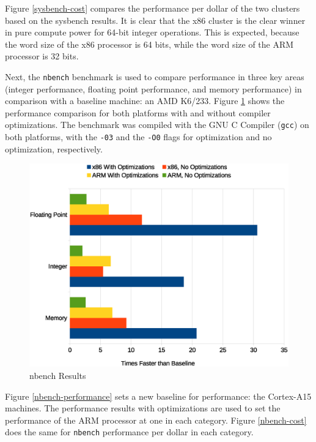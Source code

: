 \documentclass[11pt]{book}
\begin{document}
Figure \ref{sysbench-cost} compares the performance per dollar of the two clusters based
on the sysbench results.  It is clear that the x86 cluster is the clear winner in pure
compute power for 64-bit integer operations.  This is expected, because the word size of
the x86 processor is 64 bits, while the word size of the ARM processor is 32 bits.

Next, the \verb;nbench; benchmark \cite{nbench} is used to compare performance in three
key areas (integer performance, floating point performance, and memory performance) in
comparison with a baseline machine: an AMD K6/233.  Figure \ref{nbench-all} shows the
performance comparison for both platforms with and without compiler optimizations.  The
benchmark was compiled with the GNU C Compiler (\verb;gcc;) on both platforms, with the
\verb;-03; and the \verb;-O0; flags for optimization and no optimization, respectively.

\begin{figure}
\centering
\includegraphics[width=\textwidth]{nbench_all}
\caption{nbench Results}
\label{nbench-all}
\end{figure}

Figure \ref{nbench-performance} sets a new baseline for performance: the Cortex-A15
machines.  The performance results with optimizations are used to set the performance of
the ARM processor at one in each category.  Figure \ref{nbench-cost} does the same for
\verb;nbench; performance per dollar in each category.
\end{document}
